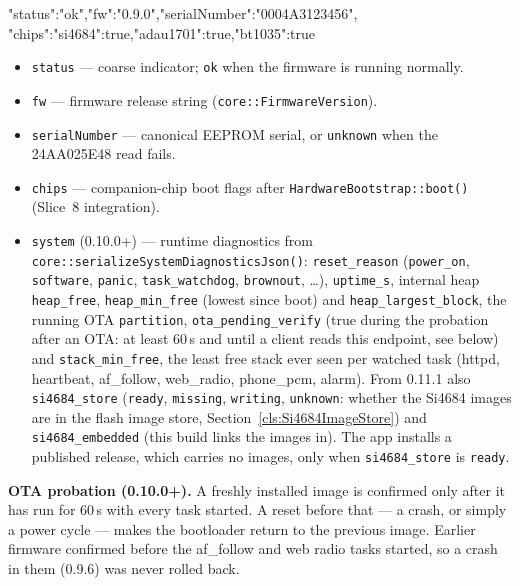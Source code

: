 \begin{drnote}
\begin{drcode}[JSON]
{"status":"ok","fw":"0.9.0","serialNumber":"0004A3123456",
 "chips":{"si4684":true,"adau1701":true,"bt1035":true}}
\end{drcode}
\begin{itemize}
  \item \texttt{status} --- coarse indicator; \texttt{ok} when the
        firmware is running normally.
  \item \texttt{fw} --- firmware release string
        (\texttt{core::FirmwareVersion}).
  \item \texttt{serialNumber} --- canonical EEPROM serial, or
        \texttt{unknown} when the 24AA025E48 read fails.
  \item \texttt{chips} --- companion-chip boot flags after
        \texttt{HardwareBootstrap::boot()} (Slice~8 integration).
  \item \texttt{system} (0.10.0+) --- runtime diagnostics from
        \texttt{core::serializeSystemDiagnosticsJson()}:
        \texttt{reset\_reason} (\texttt{power\_on}, \texttt{software},
        \texttt{panic}, \texttt{task\_watchdog}, \texttt{brownout},
        \ldots), \texttt{uptime\_s}, internal heap \texttt{heap\_free},
        \texttt{heap\_min\_free} (lowest since boot) and
        \texttt{heap\_largest\_block}, the running OTA \texttt{partition},
        \texttt{ota\_pending\_verify} (true during the probation after an
        OTA: at least 60\,s and until a client reads this endpoint, see
        below) and \texttt{stack\_min\_free}, the least
        free stack ever seen per watched task (httpd, heartbeat,
        af\_follow, web\_radio, phone\_pcm, alarm).
        From 0.11.1 also \texttt{si4684\_store} (\texttt{ready},
        \texttt{missing}, \texttt{writing}, \texttt{unknown}: whether the
        Si4684 images are in the flash image store,
        Section~\ref{cls:Si4684ImageStore}) and \texttt{si4684\_embedded}
        (this build links the images in). The app installs a published
        release, which carries no images, only when
        \texttt{si4684\_store} is \texttt{ready}.
\end{itemize}
\end{drnote}

\textbf{OTA probation (0.10.0+).} A freshly installed image is confirmed
only after it has run for 60\,s with every task started. A reset before
that --- a crash, or simply a power cycle --- makes the bootloader return
to the previous image. Earlier firmware confirmed before the af\_follow and
web radio tasks started, so a crash in them (0.9.6) was never rolled back.

